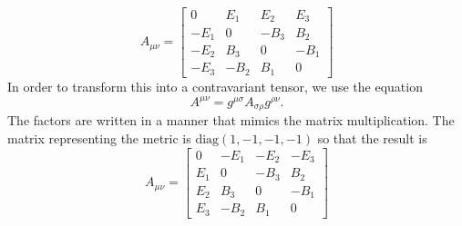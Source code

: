 \begin{enumerate}
\begin{equation}
A_{\mu\nu} = 
\begin{bmatrix}
0 & E_1 & E_2 & E_3 \\
-E_1 & 0 & -B_3 & B_2\\
-E_2 & B_3 & 0 & -B_1\\
-E_3 & -B_2 & B_1 & 0
\end{bmatrix}
\end{equation}
In order to transform this into a contravariant tensor, we use the equation
\begin{equation}\label{c3e76}
A^{\mu\nu} = g^{\mu\sigma}A_{\sigma\rho}g^{\rho\nu}.
\end{equation}
The factors are written in a manner that mimics the matrix multiplication. The matrix
representing the metric is $\text{diag}(1, -1, -1, -1)$ so that the result is
\begin{equation}\label{c3e77}
A_{\mu\nu} = 
\begin{bmatrix}
0 & -E_1 & -E_2 & -E_3 \\
E_1 & 0 & -B_3 & B_2\\
E_2 & B_3 & 0 & -B_1\\
E_3 & -B_2 & B_1 & 0
\end{bmatrix}
\end{equation}

\end{enumerate}

